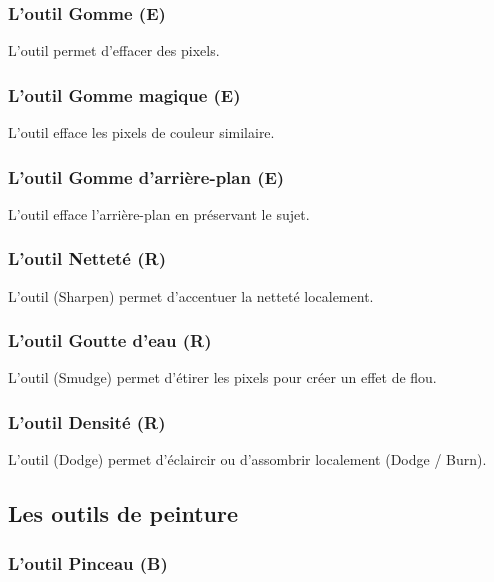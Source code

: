 \subsubsection{L'outil Gomme (E)}

L'outil  permet d'effacer des pixels.

\subsubsection{L'outil Gomme magique (E)}

L'outil  efface les pixels de couleur similaire.

\subsubsection{L'outil Gomme d'arrière-plan (E)}

L'outil  efface l'arrière-plan en préservant le sujet.

\subsubsection{L'outil Netteté (R)}

L'outil  (Sharpen) permet d'accentuer la netteté localement.

\subsubsection{L'outil Goutte d'eau (R)}

L'outil  (Smudge) permet d'étirer les pixels pour créer un effet de flou.

\subsubsection{L'outil Densité (R)}

L'outil  (Dodge) permet d'éclaircir ou d'assombrir localement (Dodge / Burn).

\subsection{Les outils de peinture}

\subsubsection{L'outil Pinceau (B)}

